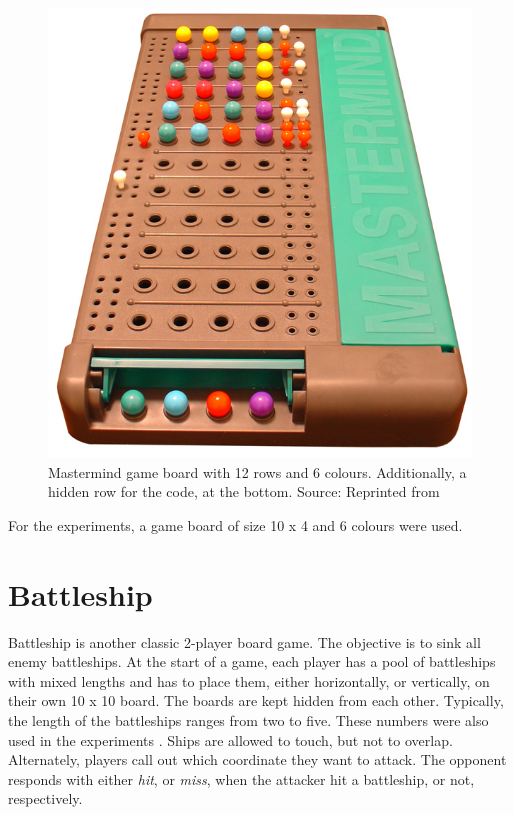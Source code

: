 \begin{figure}[H]
  \centering
  \includegraphics[scale=.25]{images/mastermind_board}
  \caption[Mastermind game board]{Mastermind game board with 12 rows and 6 colours. Additionally, a hidden row for the code, at the bottom. Source: Reprinted from \cite{enwiki:1122862799}}
  \label{fig:mastermind_board}
\end{figure}  

For the experiments, a game board of size 10 x 4 and 6 colours were used. 

\section{Battleship}
\label{ssec:battleship}
Battleship is another classic 2-player board game. The objective is to sink all enemy battleships. At the start of a game, each player has a pool of battleships with mixed lengths and has to place them, either horizontally, or vertically, on their own 10 x 10 board. The boards are kept hidden from each other. Typically, the length of the battleships ranges from two to five. 
These numbers were also used in the experiments . Ships are allowed to touch, but not to overlap. Alternately, players call out which coordinate they want to attack. The opponent responds with either \textit{hit}, or \textit{miss}, when the attacker hit a battleship, or not, respectively.

